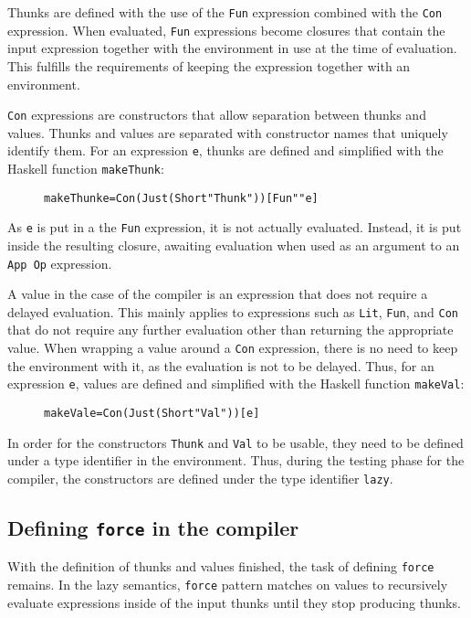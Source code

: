Thunks are defined with the use of the \texttt{Fun} expression combined
with the \texttt{Con} expression. When evaluated, \texttt{Fun} expressions
become closures that contain the input expression together with the environment
in use at the time of evaluation. This fulfills the requirements of keeping
the expression together with an environment.

\texttt{Con} expressions are constructors that allow separation between thunks
and values. Thunks and values are separated with constructor names that
uniquely identify them. For an expression \texttt{e}, thunks are defined and
simplified with the Haskell function \texttt{makeThunk}:

\begin{figure}[H]
\begin{alltt}
  makeThunk e = Con (Just (Short "Thunk")) [Fun "" e]
\end{alltt}
\end{figure}

\noindent As \texttt{e} is put in a the \texttt{Fun} expression, it is not
actually evaluated. Instead, it is put inside the resulting closure, awaiting
evaluation when used as an argument to an \texttt{App Op} expression.

A value in the case of the compiler is an expression that does not require
a delayed evaluation. This mainly applies to expressions such as \texttt{Lit},
\texttt{Fun}, and \texttt{Con} that do not require any further evaluation other
than returning the appropriate value. When wrapping
a value around a \texttt{Con} expression, there
is no need to keep the environment with it, as the evaluation is not to be
delayed. Thus, for an expression \texttt{e}, values are defined and simplified
with the Haskell function \texttt{makeVal}:

\begin{figure}[H]
\begin{alltt}
  makeVal e = Con (Just (Short "Val")) [e]
\end{alltt}
\end{figure}

In order for the constructors \texttt{Thunk} and \texttt{Val} to be usable,
they need to be defined under a type identifier in the environment. Thus,
during the testing phase for the compiler, the constructors are defined under
the type identifier \texttt{lazy}.

\subsection{Defining \texttt{force} in the compiler}
With the definition of thunks and values finished, the task of defining
\texttt{force} remains. In the lazy semantics, \texttt{force} pattern
matches on values to recursively evaluate expressions inside of the input thunks
until they stop producing thunks.

